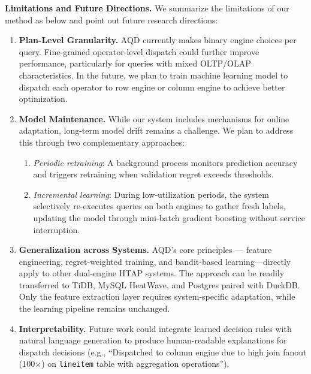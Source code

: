 \documentclass[sigconf, nonacm]{acmart}
\newcommand{\dispatcher}{AQD\xspace}
\begin{document}
\noindent
\textbf{Limitations and Future Directions.}
We summarize the limitations of our method as below and point out future research directions:
\begin{enumerate}[leftmargin=*,topsep=0pt,itemsep=3pt]
    \item \textbf{Plan-Level Granularity.} \dispatcher currently makes binary engine choices per query. Fine-grained operator-level dispatch could further improve performance, particularly for queries with mixed OLTP/OLAP characteristics. In the future, we plan to train machine learning model to dispatch each operator to row engine or column engine to achieve better optimization.
    \item \textbf{Model Maintenance.} While our system includes mechanisms for online adaptation, long-term model drift remains a challenge. We plan to address this through two complementary approaches:
        \begin{enumerate}[leftmargin=*]
        \item \emph{Periodic retraining}: A background process monitors prediction accuracy and triggers retraining when validation regret exceeds thresholds.
        \item \emph{Incremental learning}: During low-utilization periods, the system selectively re-executes queries on both engines to gather fresh labels, updating the model through mini-batch gradient boosting without service interruption.
        \end{enumerate}
    \item \textbf{Generalization across Systems.} \dispatcher's core principles — feature engineering, regret-weighted training, and bandit-based learning—directly apply to other dual-engine HTAP systems. The approach can be readily transferred to TiDB, MySQL HeatWave, and Postgres paired with DuckDB. Only the feature extraction layer requires system-specific adaptation, while the learning pipeline remains unchanged.
    \item \textbf{Interpretability.} Future work could integrate learned decision rules with natural language generation to produce human-readable explanations for dispatch decisions (e.g., ``Dispatched to column engine due to high join fanout (100×) on \texttt{lineitem} table with aggregation operations'').
\end{enumerate}


\vspace{-1em}
\end{document}
